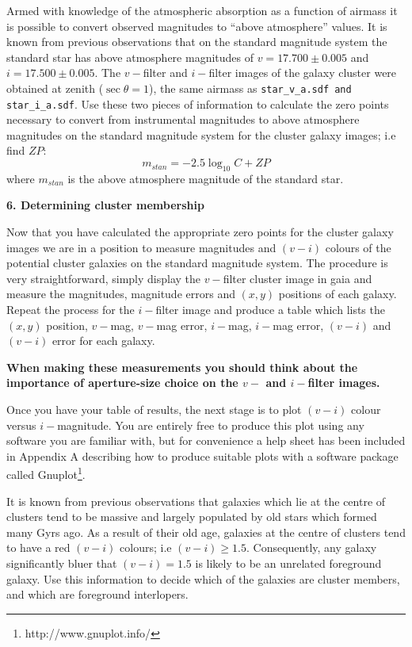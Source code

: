 Armed with knowledge of the atmospheric absorption as a function of airmass it is possible to convert observed magnitudes to ``above atmosphere'' values. It is known from previous observations that on the standard magnitude system the standard star has above atmosphere magnitudes of $v=17.700 \pm 0.005$ and $i=17.500\pm 0.005$. The $v-$filter and $i-$filter images of the galaxy cluster were obtained at zenith ($\sec \theta=1$), the same airmass as \verb,star_v_a.sdf and star_i_a.sdf,. Use these two pieces of information to calculate the zero points necessary to convert from instrumental magnitudes to above atmosphere magnitudes on the standard magnitude system for the cluster galaxy images; i.e find $ZP$:
\[
m_{stan} = -2.5\log_{10} C  + ZP 
\]
where $m_{stan}$ is the above atmosphere magnitude of the standard star.

{\large{\bf 6. Determining cluster membership}}

Now that you have calculated the appropriate zero points for the cluster galaxy images we are in a position to measure magnitudes and $(v-i)$ colours of the potential cluster galaxies on the standard magnitude system. The procedure is very straightforward, simply display the $v-$filter cluster image in {\sc gaia} and measure the magnitudes, magnitude errors and $(x,y)$ positions of each galaxy. Repeat the process for the $i-$filter image and produce a table which lists the $(x,y)$ position, $v-$mag, $v-$mag error, $i-$mag, $i-$mag error, $(v-i)$ and $(v-i)$ error for each galaxy. 

{\bf When making these measurements you should think about the importance of aperture-size choice on the $v-$ and $i-$filter images.}

Once you have your table of results, the next stage is to plot $(v-i)$ colour versus $i-$magnitude. You are entirely free to produce this plot using any software you are familiar with, but for convenience a help sheet has been included in Appendix A describing how to produce suitable plots with a software package called Gnuplot\footnote{http://www.gnuplot.info/}.

It is known from previous observations that galaxies which lie at the centre of clusters tend to be massive and largely populated by old stars which formed many Gyrs ago. As a result of their old age, galaxies at the centre of clusters tend to have a red $(v-i)$ colours; i.e $(v-i)\geq1.5$. Consequently, any galaxy significantly bluer that $(v-i)=1.5$ is likely to be an unrelated foreground galaxy. Use this information to decide which of the galaxies are cluster members, and which are foreground interlopers.

